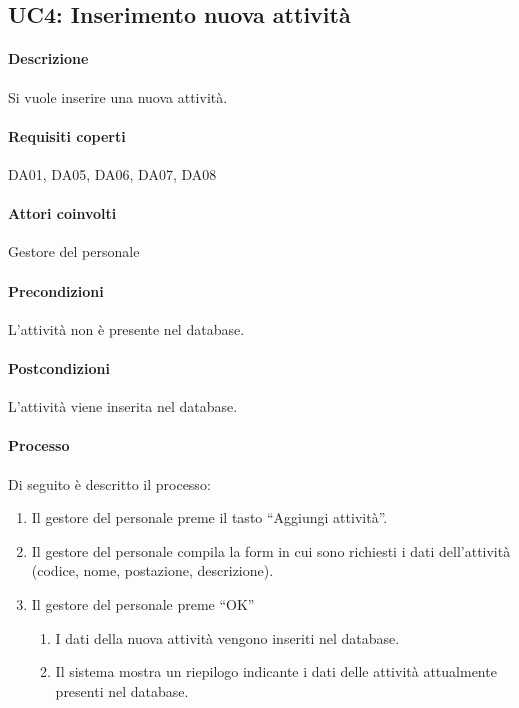 \subsection{UC4: Inserimento nuova attività}
\paragraph{Descrizione}
Si vuole inserire una nuova attività.
\paragraph{Requisiti coperti}
DA01, DA05, DA06, DA07, DA08
\paragraph{Attori coinvolti}
Gestore del personale
\paragraph{Precondizioni}
L'attività non è presente nel database.
\paragraph{Postcondizioni}
L'attività viene inserita nel database.
\paragraph{Processo}
Di seguito è descritto il processo:
\begin{enumerate}
	\item Il gestore del personale preme il tasto “Aggiungi attività”.
	\item Il gestore del personale compila la form in cui sono richiesti i dati dell'attività (codice, nome, postazione, descrizione). 
	\item Il gestore del personale preme “OK”
		\begin{enumerate}
			\item I dati della nuova attività vengono inseriti nel database.
			\item Il sistema mostra un riepilogo indicante i dati delle attività attualmente presenti nel database.
		\end{enumerate}
\end{enumerate}
